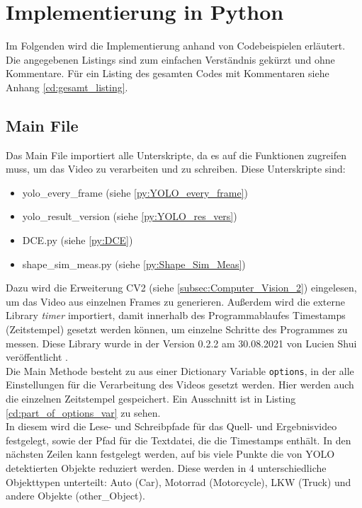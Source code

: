 \section{Implementierung in Python}{\label{implementation_in_python}}
	Im Folgenden wird die Implementierung anhand von Codebeispielen erläutert. Die angegebenen Listings sind zum einfachen Verständnis gekürzt und ohne Kommentare. Für ein Listing des gesamten Codes mit Kommentaren siehe Anhang \ref{cd:gesamt_listing}.
\subsection{Main File}
{ 
	Das Main File importiert alle Unterskripte, da es auf die Funktionen zugreifen muss, um das Video zu verarbeiten und zu schreiben. Diese Unterskripte sind: 
	\begin{itemize}
		\item yolo\_every\_frame (siehe \ref{py:YOLO_every_frame})
		\item yolo\_result\_version (siehe \ref{py:YOLO_res_vers})
		\item DCE.py (siehe \ref{py:DCE})
		\item shape\_sim\_meas.py (siehe \ref{py:Shape_Sim_Meas})
	\end{itemize}
	Dazu wird die Erweiterung CV2 (siehe \ref{subsec:Computer_Vision_2}) eingelesen, um das Video aus einzelnen Frames zu generieren.
	Außerdem wird die externe Library \textit{timer} importiert, damit innerhalb des Programmablaufes Timestamps (Zeitstempel) gesetzt werden können, um einzelne Schritte des Programmes zu messen. Diese Library wurde in der Version 0.2.2 am 30.08.2021 von Lucien Shui veröffentlicht \citep{Shui2021}.  \\
	Die Main Methode besteht zu aus einer Dictionary Variable \lstinline|options|, in der alle Einstellungen für die Verarbeitung des Videos gesetzt werden. Hier werden auch die einzelnen Zeitstempel gespeichert. Ein Ausschnitt ist in Listing \ref{cd:part_of_options_var} zu sehen. \\
	In diesem wird die Lese- und Schreibpfade für das Quell- und Ergebnisvideo festgelegt, sowie der Pfad für die Textdatei, die die Timestamps enthält. In den nächsten Zeilen kann festgelegt werden, auf bis viele Punkte die von YOLO detektierten Objekte reduziert werden. Diese werden in 4 unterschiedliche Objekttypen unterteilt: Auto (Car), Motorrad (Motorcycle), LKW (Truck) und andere Objekte (other\_Object). \\
}
